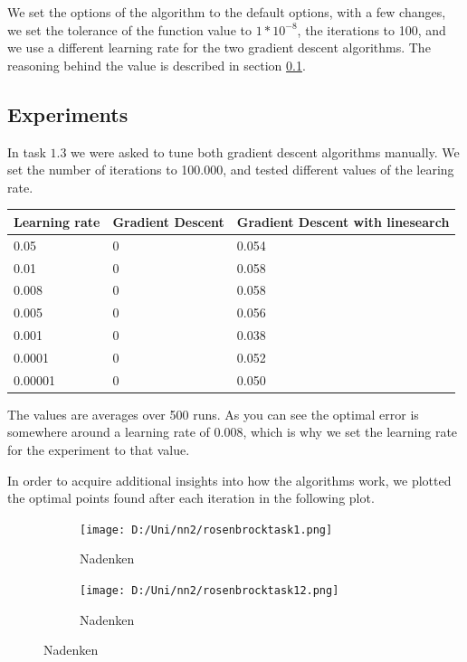 \documentclass{article}
\begin{document}
We set the options of the algorithm to the default options, with a few changes, we set the tolerance of the function value to $1*10^{-8}$, the iterations to 100, and we use a different learning rate for the two gradient descent algorithms. The reasoning behind the value is described in section \ref{sec:experiments}.

\subsection{Experiments}
\label{sec:experiments}
In task $1.3$ we were asked to tune both gradient descent algorithms manually. We set the number of iterations to 100.000, and tested different values of the learing rate.

\begin{table}[H]
	\centering
		\begin{tabular}{l|l|l}
		Learning rate & Gradient Descent & Gradient Descent with linesearch \\
		\hline
		0.05 & 0 & 0.054 \\
		0.01 & 0 & 0.058 \\
		0.008 & 0 & 0.058 \\
		0.005 & 0 & 0.056 \\
		0.001 & 0 & 0.038 \\
		0.0001 & 0 & 0.052 \\
		0.00001 & 0 & 0.050 \\
		\end{tabular}
\end{table}
    
The values are averages over 500 runs. As you can see the optimal error is somewhere around a learning rate of 0.008, which is why we set the learning rate for the experiment to that value.

In order to acquire additional insights into how the algorithms work, we plotted the optimal points found after each iteration in the following plot.

\begin{figure}[H]
	\centering
	\begin{subfigure}[b]{0.45\textwidth}
		\texttt{[image: D:/Uni/nn2/rosenbrocktask1.png]}
		\caption{Nadenken}
		\label{fig:rosenbrocktask1}
	\end{subfigure}
	\begin{subfigure}[b]{0.45\textwidth}
		\texttt{[image: D:/Uni/nn2/rosenbrocktask12.png]}
		\caption{Nadenken}
		\label{fig:rosenbrocktask1}
	\end{subfigure}	
\end{figure}
\end{document}
